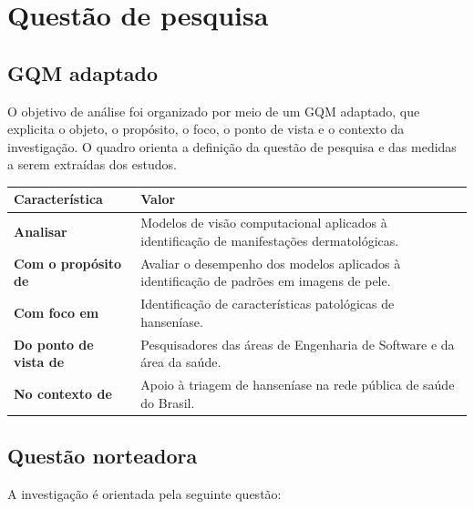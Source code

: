 \section{Questão de pesquisa}\label{gqm-adaptado-e-questuxe3o-de-pesquisa}

\subsection{GQM adaptado}

O objetivo de análise foi organizado por meio de um GQM adaptado, que
explicita o objeto, o propósito, o foco, o ponto de vista e o contexto
da investigação. O quadro orienta a definição da questão de pesquisa e
das medidas a serem extraídas dos estudos.

{\def\LTcaptype{none} %
\begin{longtable}[]{@{}
  >{\raggedright\arraybackslash}p{}
  >{\raggedright\arraybackslash}p{}@{}}
\toprule\noalign{}
\begin{minipage}[b]{\linewidth}\raggedright
Característica
\end{minipage} & \begin{minipage}[b]{\linewidth}\raggedright
Valor
\end{minipage} \\
\midrule\noalign{}
\endhead
\bottomrule\noalign{}
\endlastfoot
\textbf{Analisar} & Modelos de visão computacional aplicados à
identificação de manifestações dermatológicas. \\
\textbf{Com o propósito de} & Avaliar o desempenho dos modelos aplicados
à identificação de padrões em imagens de pele. \\
\textbf{Com foco em} & Identificação de características patológicas de
hanseníase. \\
\textbf{Do ponto de vista de} & Pesquisadores das áreas de Engenharia de
Software e da área da saúde. \\
\textbf{No contexto de} & Apoio à triagem de hanseníase na rede pública
de saúde do Brasil. \\
\end{longtable}
}

\subsection{Questão norteadora}

A investigação é orientada pela seguinte questão:

